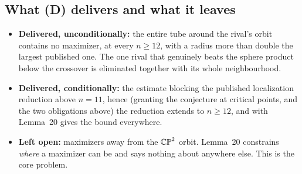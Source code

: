 \subsection{What (D) delivers and what it leaves}

\begin{itemize}[leftmargin=1.4em]
\item \textbf{Delivered, unconditionally:} the entire tube around the rival's orbit contains no maximizer, at every $n\ge12$, with a radius more than double the largest published one. The one rival that genuinely beats the sphere product below the crossover is eliminated together with its whole neighbourhood.
\item \textbf{Delivered, conditionally:} the estimate blocking the published localization reduction above $n=11$, hence (granting the conjecture at critical points, and the two obligations above) the reduction extends to $n\ge12$, and with Lemma~20 gives the bound everywhere.
\item \textbf{Left open:} maximizers away from the $\mathbb{CP}^2$ orbit. Lemma~20 constrains \emph{where} a maximizer can be and says nothing about anywhere else. This is the core problem.
\end{itemize}
